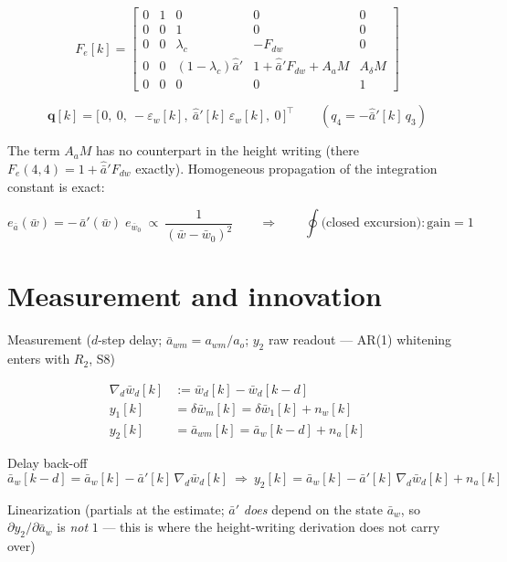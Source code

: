 \documentclass[11pt,a4paper,fontset=none]{ctexart}
\begin{document}
\begin{equation*}
F_e[k] =
\begin{bmatrix}
0 & 1 & 0 & 0 & 0 \\
0 & 0 & 1 & 0 & 0 \\
0 & 0 & \lambda_c & -F_{dw} & 0 \\
0 & 0 & (1-\lambda_c)\hat{\bar{a}}' &
  1 + \hat{\bar{a}}'F_{dw} + A_a M & A_{\delta} M \\
0 & 0 & 0 & 0 & 1
\end{bmatrix}
\end{equation*}

\begin{equation*}
\mathbf{q}[k] = \bigl[\,0,\ 0,\ -\varepsilon_w[k],\
\hat{\bar{a}}'[k]\,\varepsilon_w[k],\ 0\,\bigr]^{\top}
\qquad (q_4 = -\hat{\bar{a}}'[k]\,q_3)
\end{equation*}

The term $A_a M$ has no counterpart in the height writing (there $F_e(4,4) =
1 + \hat{\bar{a}}'F_{dw}$ exactly).  Homogeneous propagation of the integration
constant is exact:

\begin{equation*}
e_{\bar{a}}(\bar{w}) = -\,\bar{a}'(\bar{w})\;e_{\bar{w}_0}
\ \propto\ \frac{1}{(\bar{w}-\bar{w}_0)^{2}}
\qquad\Longrightarrow\qquad
\oint \text{(closed excursion)} : \text{gain} = 1
\end{equation*}

\section{Measurement and innovation}

Measurement ($d$-step delay; $\bar{a}_{wm} = a_{wm}/a_o$; $y_2$ raw readout ---
AR(1) whitening enters with $R_2$, S8)

\begin{align*}
\nabla_d\bar{w}_d[k] &:= \bar{w}_d[k] - \bar{w}_d[k-d] \\
y_1[k] &= \delta\bar{w}_m[k] = \delta\bar{w}_1[k] + n_w[k] \\
y_2[k] &= \bar{a}_{wm}[k] = \bar{a}_w[k-d] + n_a[k]
\end{align*}

Delay back-off
\begin{equation*}
\bar{a}_w[k-d] = \bar{a}_w[k] - \bar{a}'[k]\,\nabla_d\bar{w}_d[k]
\ \Longrightarrow\
y_2[k] = \bar{a}_w[k] - \bar{a}'[k]\,\nabla_d\bar{w}_d[k] + n_a[k]
\end{equation*}

Linearization (partials at the estimate; $\bar{a}'$ \emph{does} depend on the
state $\bar{a}_w$, so $\partial y_2/\partial\bar{a}_w$ is \emph{not} $1$ ---
this is where the height-writing derivation does not carry over)
\end{document}

